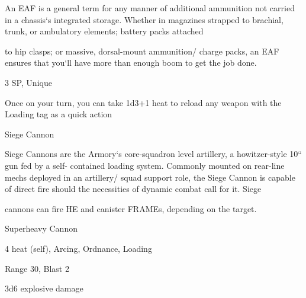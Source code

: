 An EAF is a general term for any manner of additional ammunition not carried in a chassis‘s integrated
storage. Whether in magazines strapped to brachial, trunk, or ambulatory elements; battery packs attached

to hip clasps; or massive, dorsal-mount ammunition/ charge packs, an EAF ensures that you‘ll have more
than enough boom to get the job done.

3 SP, Unique

Once on your turn, you can take 1d3+1 heat to reload any weapon with the Loading tag as a
quick action


Siege Cannon

Siege Cannons are the Armory‘s core-squadron level artillery, a howitzer-style 10“ gun fed by a self-
contained loading system. Commonly mounted on rear-line mechs deployed in an artillery/ squad support
role, the Siege Cannon is capable of direct fire should the necessities of dynamic combat call for it. Siege

cannons can fire HE and canister FRAMEs, depending on the target.

Superheavy Cannon

4 heat (self), Arcing, Ordnance, Loading

Range 30, Blast 2

3d6 explosive damage


